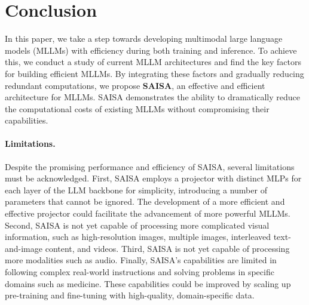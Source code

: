 \section{Conclusion}
In this paper, we take a step towards developing multimodal large language models (MLLMs) with efficiency during both training and inference.
To achieve this, we conduct a study of current MLLM architectures and find the key factors for building efficient MLLMs.
By integrating these factors and gradually reducing redundant computations, we propose \textbf{SAISA}, an effective and efficient architecture for MLLMs.
SAISA demonstrates the ability to dramatically reduce the computational costs of existing MLLMs without compromising their capabilities.

\vspace{-0.35cm}
\paragraph{Limitations.}
Despite the promising performance and efficiency of SAISA, several limitations must be acknowledged.
First, SAISA employs a projector with distinct MLPs for each layer of the LLM backbone for simplicity, introducing a number of parameters that cannot be ignored.
The development of a more efficient and effective projector could facilitate the advancement of more powerful MLLMs.
Second, SAISA is not yet capable of processing more complicated visual information, such as high-resolution images, multiple images, interleaved text-and-image content, and videos.
Third, SAISA is not yet capable of processing more modalities such as audio.
Finally, SAISA's capabilities are limited in following complex real-world instructions and solving problems in specific domains such as medicine.
These capabilities could be improved by scaling up pre-training and fine-tuning with high-quality, domain-specific data.